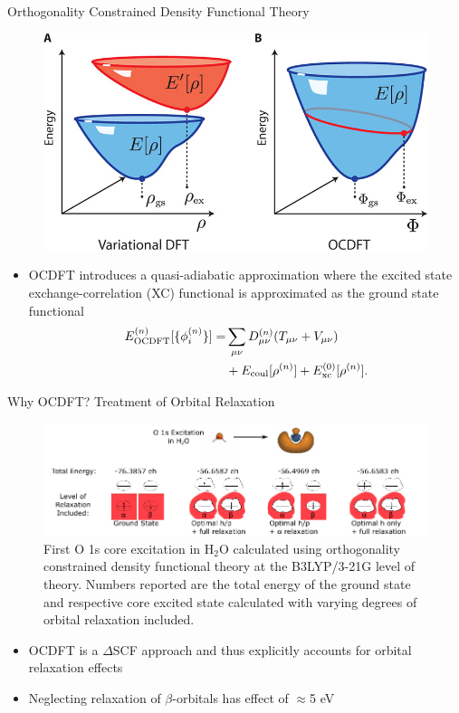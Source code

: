 \documentclass[t]{beamer}
\begin{document}
\begin{frame}{Orthogonality Constrained Density Functional Theory}
\begin{figure}[!t]
\includegraphics[scale=1.0]{ocdft_fig.jpeg}
\end{figure}
\begin{itemize}
\item OCDFT introduces a quasi-adiabatic approximation where the excited state exchange-correlation (XC) functional is approximated as the ground state functional
\begin{align}
\nonumber
E^{(n)}_{\rm OCDFT}[\{\phi^{(n)}_i\}]=& \sum_{\mu \nu} D^{(n)}_{\mu \nu}(T_{\mu \nu} + V_{\mu \nu})\\
 &+ E_{\rm coul}[\rho^{(n)}] + E^{(0)}_{\rm xc}[\rho^{(n)}]. 
\end{align}
\end{itemize}
\end{frame}

\begin{frame}{Why OCDFT? Treatment of Orbital Relaxation}
\begin{figure}
\centering
\includegraphics[scale=0.7]{h_p_algorithms.pdf}
\caption*{First O 1s core excitation in H$_2$O calculated using orthogonality constrained density functional theory at the B3LYP/3-21G level of theory. Numbers reported are the total energy of the ground state and respective core excited state calculated with varying degrees of orbital relaxation included.}
\end{figure}
\begin{itemize}
\item OCDFT is a $\Delta$SCF approach and thus explicitly accounts for orbital relaxation effects
\item Neglecting relaxation of $\beta$-orbitals has effect of $\approx$5 eV
\end{itemize}
\end{frame}
\end{document}

